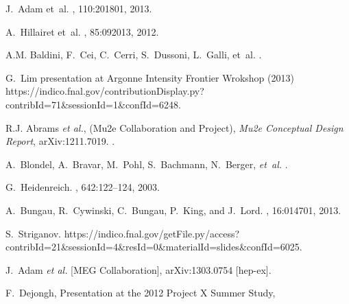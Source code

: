 \begin{thebibliography}{99}
J.~Adam et~al.
, 110:201801, 2013.

A.~Hillairet et~al.
, 85:092013, 2012.

A.M. Baldini, F.~Cei, C.~Cerri, S.~Dussoni, L.~Galli, et~al.
.

G.~Lim presentation at Argonne Intensity Frontier Wrokshop (2013) \hfill\break 
{\small https://indico.fnal.gov/contributionDisplay.py?contribId=71\&sessionId=1\&confId=6248}.

 R.J. Abrams {\it et al.}, (Mu2e Collaboration and Project), 
 {\it{Mu2e Conceptual Design Report}}, arXiv:1211.7019.
.

A.~Blondel, A.~Bravar, M.~Pohl, S.~Bachmann, N.~Berger, {\it et~al.}
.

G.~Heidenreich.
, 642:122--124, 2003.

A.~Bungau, R.~Cywinski, C.~Bungau, P.~King, and J.~Lord.
, 16:014701, 2013.

S.~Striganov.
{\small 
  https://indico.fnal.gov/getFile.py/access?contribId=21\&sessionId=4\&resId=0\&materialId=slides\&confId=6025.}


  J.~Adam {\it et al.}  [MEG Collaboration],
  arXiv:1303.0754 [hep-ex].
  
F.~Dejongh, Presentation at the 2012 Project X Summer Study, \hfill{}


\end{thebibliography}
